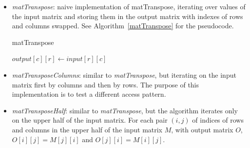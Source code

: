 \documentclass[conference]{IEEEtran}
\begin{document}
\begin{itemize}
\item \textit{matTranspose}: naive implementation of matTranspose, iterating over values of the input matrix and storing them in the output matrix with indexes of rows and columns swapped. See Algorithm~\ref{matTranspose} for the pseudocode.

\begin{algorithm}
	\caption{matTranspose}\label{matTranspose}
	\begin{algorithmic}[1]
		\State $output[c][r] \gets input[r][c]$
		\EndFor
		\EndFor
	\end{algorithmic}
\end{algorithm}

    \item \textit{matTransposeColumns}: similar to \textit{matTranspose}, but iterating on the input matrix first by columns and then by rows.
  The purpose of this implementation is to test a different access pattern.

  \item \textit{matTransposeHalf}: similar to \textit{matTranspose}, but the algorithm
  iterates only on the upper half of the input matrix. For each
  pair $(i,j)$ of indices of rows and columns in the upper half of the input matrix $M$, with output matrix $O$, $O[i][j]=M[j][i]$ and $O[j][i] = M[i][j]$.

  

\end{itemize}
\end{document}
